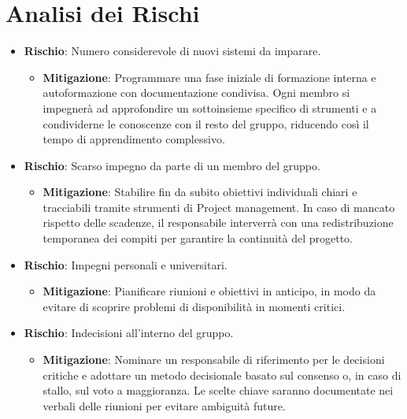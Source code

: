 \documentclass[a4paper,12pt]{article}
\begin{document}
\section{Analisi dei Rischi}
\begin{itemize}
    \item \textbf{Rischio}: Numero considerevole di nuovi sistemi da imparare.
        \begin{itemize}
            \item \textbf{Mitigazione}: Programmare una fase iniziale di formazione interna e autoformazione con documentazione condivisa. Ogni membro si impegnerà ad approfondire un sottoinsieme specifico di strumenti e a condividerne le conoscenze con il resto del gruppo, riducendo così il tempo di apprendimento complessivo.
        \end{itemize}

    \item \textbf{Rischio}: Scarso impegno da parte di un membro del gruppo.
        \begin{itemize}
            \item \textbf{Mitigazione}: Stabilire fin da subito obiettivi individuali chiari e tracciabili tramite strumenti di Project management. In caso di mancato rispetto delle scadenze, il responsabile interverrà con una redistribuzione temporanea dei compiti per garantire la continuità del progetto.
        \end{itemize}

    \item \textbf{Rischio}: Impegni personali e universitari.
        \begin{itemize}
            \item \textbf{Mitigazione}: Pianificare riunioni e obiettivi in anticipo, in modo da evitare di scoprire problemi di disponibilità in momenti critici. 
        \end{itemize}

    \item \textbf{Rischio}: Indecisioni all'interno del gruppo.
        \begin{itemize}
            \item \textbf{Mitigazione}: Nominare un responsabile di riferimento per le decisioni critiche e adottare un metodo decisionale basato sul consenso o, in caso di stallo, sul voto a maggioranza. Le scelte chiave saranno documentate nei verbali delle riunioni per evitare ambiguità future.
        \end{itemize}


\end{itemize}
\end{document}
